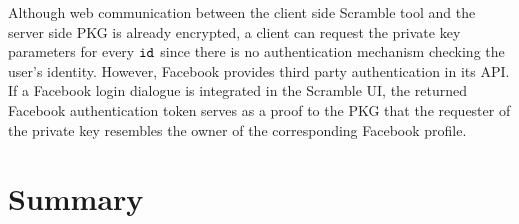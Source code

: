 Although web communication between the client side Scramble tool and the server side PKG is already encrypted, a client can request the private key parameters for every $\mathtt{id}_{}$ since there is no authentication mechanism checking the user's identity. However, Facebook provides third party authentication in its API. If a Facebook login dialogue is integrated in the Scramble UI, the returned Facebook authentication token serves as a proof to the PKG that the requester of the private key resembles the owner of the corresponding Facebook profile.

\section{Summary}

